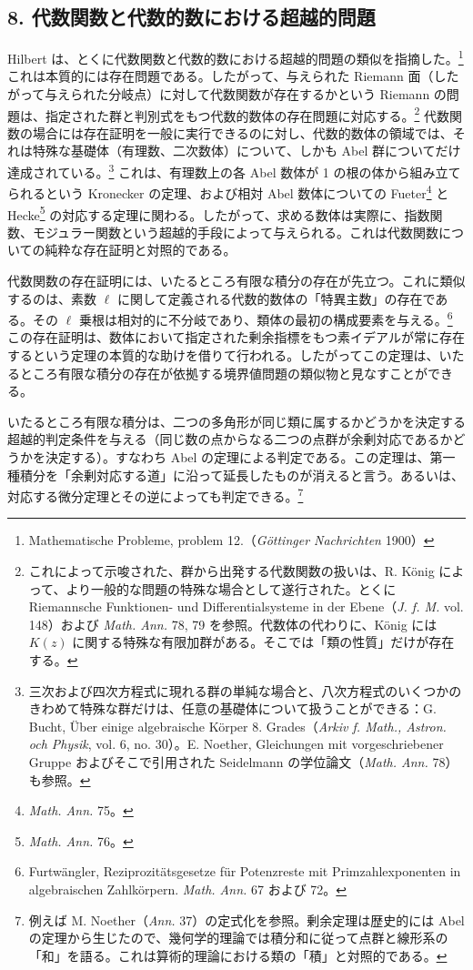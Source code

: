 \documentclass[11pt]{article}
\begin{document}
\subsection*{8. 代数関数と代数的数における超越的問題}
Hilbert は、とくに代数関数と代数的数における超越的問題の類似を指摘した。\footnote{Mathematische Probleme, problem 12.（\emph{Göttinger Nachrichten} 1900）} これは本質的には存在問題である。したがって、与えられた Riemann 面（したがって与えられた分岐点）に対して代数関数が存在するかという Riemann の問題は、指定された群と判別式をもつ代数的数体の存在問題に対応する。\footnote{これによって示唆された、群から出発する代数関数の扱いは、R. König によって、より一般的な問題の特殊な場合として遂行された。とくに Riemannsche Funktionen- und Differentialsysteme in der Ebene（\emph{J. f. M.} vol. 148）および \emph{Math. Ann.} 78, 79 を参照。代数体の代わりに、König には \(K(z)\) に関する特殊な有限加群がある。そこでは「類の性質」だけが存在する。} 代数関数の場合には存在証明を一般に実行できるのに対し、代数的数体の領域では、それは特殊な基礎体（有理数、二次数体）について、しかも Abel 群についてだけ達成されている。\footnote{三次および四次方程式に現れる群の単純な場合と、八次方程式のいくつかのきわめて特殊な群だけは、任意の基礎体について扱うことができる：G. Bucht, Über einige algebraische Körper 8. Grades（\emph{Arkiv f. Math., Astron. och Physik}, vol. 6, no. 30）。E. Noether, Gleichungen mit vorgeschriebener Gruppe およびそこで引用された Seidelmann の学位論文（\emph{Math. Ann.} 78）も参照。} これは、有理数上の各 Abel 数体が 1 の根の体から組み立てられるという Kronecker の定理、および相対 Abel 数体についての Fueter\footnote{\emph{Math. Ann.} 75。} と Hecke\footnote{\emph{Math. Ann.} 76。} の対応する定理に関わる。したがって、求める数体は実際に、指数関数、モジュラー関数という超越的手段によって与えられる。これは代数関数についての純粋な存在証明と対照的である。

代数関数の存在証明には、いたるところ有限な積分の存在が先立つ。これに類似するのは、素数 \(\ell\) に関して定義される代数的数体の「特異主数」の存在である。その \(\ell\) 乗根は相対的に不分岐であり、類体の最初の構成要素を与える。\footnote{Furtwängler, Reziprozitätsgesetze für Potenzreste mit Primzahlexponenten in algebraischen Zahlkörpern. \emph{Math. Ann.} 67 および 72。} この存在証明は、数体において指定された剰余指標をもつ素イデアルが常に存在するという定理の本質的な助けを借りて行われる。したがってこの定理は、いたるところ有限な積分の存在が依拠する境界値問題の類似物と見なすことができる。

いたるところ有限な積分は、二つの多角形が同じ類に属するかどうかを決定する超越的判定条件を与える（同じ数の点からなる二つの点群が余剰対応であるかどうかを決定する）。すなわち Abel の定理による判定である。この定理は、第一種積分を「余剰対応する道」に沿って延長したものが消えると言う。あるいは、対応する微分定理とその逆によっても判定できる。\footnote{例えば M. Noether（\emph{Ann.} 37）の定式化を参照。剰余定理は歴史的には Abel の定理から生じたので、幾何学的理論では積分和に従って点群と線形系の「和」を語る。これは算術的理論における類の「積」と対照的である。}
\end{document}
